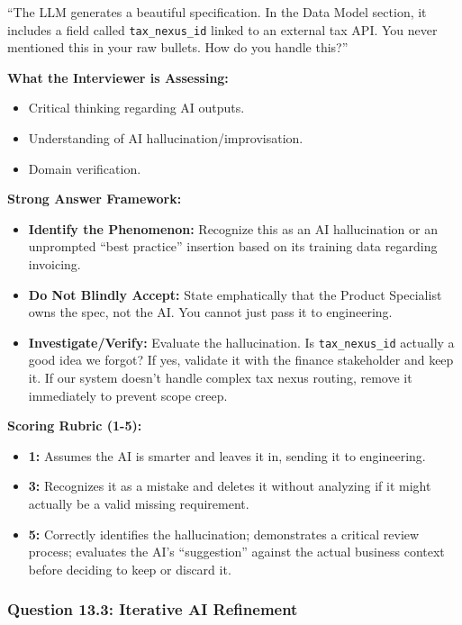 \documentclass[
  11pt,
  openany,
  oneside]{book}
\providecommand{\tightlist}{%
  \setlength{\itemsep}{0pt}\setlength{\parskip}{0pt}}
\begin{document}
``The LLM generates a beautiful specification. In the Data Model
section, it includes a field called \texttt{tax\_nexus\_id} linked to an
external tax API. You never mentioned this in your raw bullets. How do
you handle this?''

\textbf{What the Interviewer is Assessing:}

\begin{itemize}
\tightlist
\item
  Critical thinking regarding AI outputs.
\item
  Understanding of AI hallucination/improvisation.
\item
  Domain verification.
\end{itemize}

\textbf{Strong Answer Framework:}

\begin{itemize}
\tightlist
\item
  \textbf{Identify the Phenomenon:} Recognize this as an AI
  hallucination or an unprompted ``best practice'' insertion based on
  its training data regarding invoicing.
\item
  \textbf{Do Not Blindly Accept:} State emphatically that the Product
  Specialist owns the spec, not the AI. You cannot just pass it to
  engineering.
\item
  \textbf{Investigate/Verify:} Evaluate the hallucination. Is
  \texttt{tax\_nexus\_id} actually a good idea we forgot? If yes,
  validate it with the finance stakeholder and keep it. If our system
  doesn't handle complex tax nexus routing, remove it immediately to
  prevent scope creep.
\end{itemize}

\textbf{Scoring Rubric (1-5):}

\begin{itemize}
\tightlist
\item
  \textbf{1:} Assumes the AI is smarter and leaves it in, sending it to
  engineering.
\item
  \textbf{3:} Recognizes it as a mistake and deletes it without
  analyzing if it might actually be a valid missing requirement.
\item
  \textbf{5:} Correctly identifies the hallucination; demonstrates a
  critical review process; evaluates the AI's ``suggestion'' against the
  actual business context before deciding to keep or discard it.
\end{itemize}

\subsubsection{Question 13.3: Iterative AI
Refinement}\label{question-13.3-iterative-ai-refinement}
\end{document}
